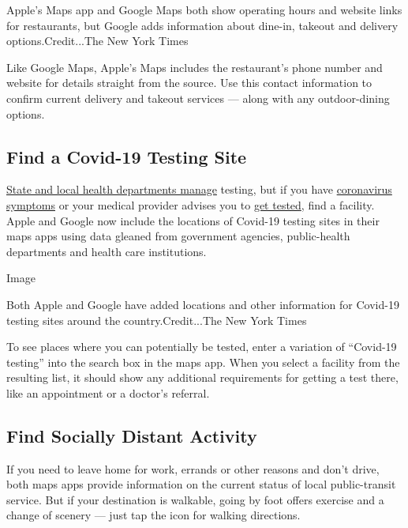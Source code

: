 Apple's Maps app and Google Maps both show operating hours and website
links for restaurants, but Google adds information about dine-in,
takeout and delivery options.Credit...The New York Times

Like Google Maps, Apple's Maps includes the restaurant's phone number
and website for details straight from the source. Use this contact
information to confirm current delivery and takeout services --- along
with any outdoor-dining options.

\hypertarget{find-a-covid-19-testing-site}{%
\subsection{Find a Covid-19 Testing
Site}\label{find-a-covid-19-testing-site}}

\href{https://www.cdc.gov/coronavirus/2019-ncov/symptoms-testing/testing.html}{State
and local health departments manage} testing, but if you have
\href{https://www.cdc.gov/coronavirus/2019-ncov/symptoms-testing/symptoms.html}{coronavirus
symptoms} or your medical provider advises you to
\href{https://www.cdc.gov/coronavirus/2019-ncov/lab/testing.html}{get
tested}, find a facility. Apple and Google now include the locations of
Covid-19 testing sites in their maps apps using data gleaned from
government agencies, public-health departments and health care
institutions.

Image

Both Apple and Google have added locations and other information for
Covid-19 testing sites around the country.Credit...The New York Times

To see places where you can potentially be tested, enter a variation of
``Covid-19 testing'' into the search box in the maps app. When you
select a facility from the resulting list, it should show any additional
requirements for getting a test there, like an appointment or a doctor's
referral.

\hypertarget{find-socially-distant-activity}{%
\subsection{Find Socially Distant
Activity}\label{find-socially-distant-activity}}

If you need to leave home for work, errands or other reasons and don't
drive, both maps apps provide information on the current status of local
public-transit service. But if your destination is walkable, going by
foot offers exercise and a change of scenery --- just tap the icon for
walking directions.


